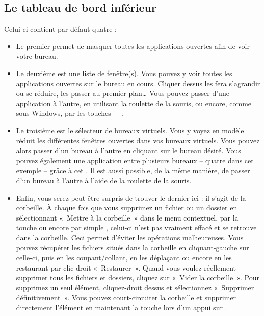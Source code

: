\subsection{Le tableau de bord inférieur}
Celui-ci contient par défaut quatre  :
\begin{itemize}
\item Le premier permet de masquer toutes les applications ouvertes afin de voir votre bureau. 
\item Le deuxième est une liste de fenêtre(s). Vous pouvez y voir toutes les applications ouvertes sur le bureau en cours. Cliquer dessus les fera s'agrandir ou se réduire, les passer au premier plan\ldots{} Vous pouvez passer d'une application à l'autre, en utilisant la roulette de la souris, ou encore, comme sous Windows, par les touches  + .
\item Le troisième est le sélecteur de bureaux virtuels. Vous y voyez en modèle réduit les différentes fenêtres ouvertes dans vos bureaux virtuels. Vous pouvez alors passer d'un bureau à l'autre en cliquant sur le bureau désiré. Vous pouvez également  une application entre plusieurs bureaux -- quatre dans cet exemple -- grâce à cet . Il est aussi possible, de la même manière, de passer d'un bureau à l'autre à l'aide de la roulette de la souris.
\item Enfin, vous serez peut-être surpris de trouver le dernier  ici : il s'agit de la corbeille. À chaque fois que vous supprimez un fichier ou un dossier en sélectionnant «~Mettre à la corbeille~» dans le menu contextuel, par la touche  ou encore par simple , celui-ci n'est pas vraiment effacé et se retrouve dans la corbeille. Ceci permet d'éviter les opérations malheureuses. Vous pouvez récupérer les fichiers situés dans la corbeille en cliquant-gauche sur celle-ci, puis en les coupant/collant, en les déplaçant ou encore en les restaurant par clic-droit \FlecheDroite «~Restaurer~». Quand vous voulez réellement supprimer tous les fichiers et dossiers, cliquez sur «~Vider la corbeille~». Pour supprimez un seul élément, cliquez-droit dessus et sélectionnez «~Supprimer définitivement~». Vous pouvez court-circuiter la corbeille et supprimer directement l'élément en maintenant la touche  lors d'un appui sur .
\end{itemize}
